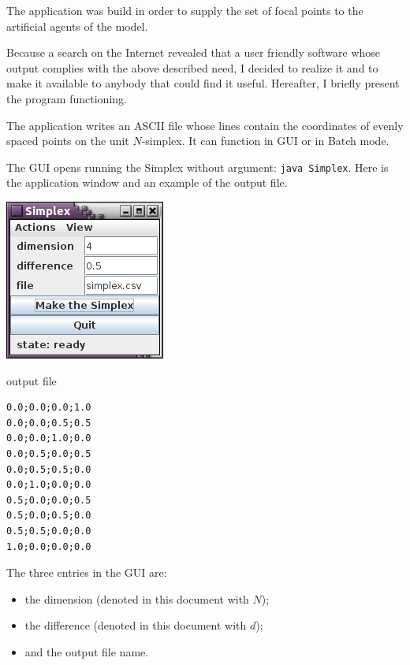 \documentclass{jors}
\begin{document}
The application was build in order to supply the set of focal points to the artificial agents of the model.

Because a search on the Internet revealed that a user friendly software whose output complies with the above described need, I decided to realize it and to make it available to anybody that could find it useful. Hereafter, I briefly present the program functioning.

The application writes an ASCII file whose lines contain the coordinates of evenly spaced points on the unit $N$-simplex.  
It can function in GUI or in Batch mode.

The GUI opens running the Simplex without argument: \verb+java Simplex+.
Here is the application window and an example of the output file.

\vspace{1cm}

\begin{minipage}{0.5\textwidth}
\includegraphics[scale=1]{fig1.png}
\end{minipage}
\hspace{1cm}
\begin{minipage}{0.4\textwidth}
output file 

\begin{verbatim}
0.0;0.0;0.0;1.0
0.0;0.0;0.5;0.5
0.0;0.0;1.0;0.0
0.0;0.5;0.0;0.5
0.0;0.5;0.5;0.0
0.0;1.0;0.0;0.0
0.5;0.0;0.0;0.5
0.5;0.0;0.5;0.0
0.5;0.5;0.0;0.0
1.0;0.0;0.0;0.0
\end{verbatim}
\end{minipage}

\vspace{1cm}

The three entries in the GUI are: 
\begin{itemize}
\item the dimension (denoted in this document with $N$);
\item the difference (denoted in this document with $d$);
\item and the output file name.
\end{itemize}
\end{document}
